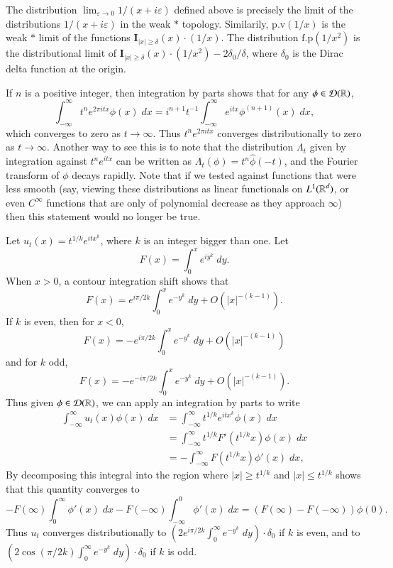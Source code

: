 \begin{example}
    The distribution $\lim_{\varepsilon \to 0} 1/(x + i\varepsilon)$ defined above is precisely the limit of the distributions $1/(x + i \varepsilon)$ in the weak $*$ topology. Similarily, $\text{p.v}(1/x)$ is the weak $*$ limit of the functions $\mathbf{I}_{|x| \geq \delta}(x) \cdot (1/x)$. The distribution $\text{f.p}(1/x^2)$ is the distributional limit of $\mathbf{I}_{|x| \geq \delta}(x) \cdot (1/x^2) - 2 \delta_0 / \delta$, where $\delta_0$ is the Dirac delta function at the origin.
\end{example}

\begin{example}
    If $n$ is a positive integer, then integration by parts shows that for any $\phi \in \operatorname{\mathcal{D}}(\operatorname{\mathbb{R}})$,
    \[ \int_{-\infty}^\infty t^n e^{2 \pi itx} \phi(x)\; dx = i^{n+1} t^{-1} \int_{-\infty}^\infty e^{itx} \phi^{(n+1)}(x)\; dx, \]
    which converges to zero as $t \to \infty$. Thus $t^n e^{2 \pi itx}$ converges distributionally to zero as $t \to \infty$. Another way to see this is to note that the distribution $\Lambda_t$ given by integration against $t^n e^{itx}$ can be written as $\Lambda_t(\phi) = t^n \widehat{\phi}(-t)$, and the Fourier transform of $\phi$ decays rapidly. Note that if we tested against functions that were less smooth (say, viewing these distributions as linear functionals on $L^1(\operatorname{\mathbb{R}}^d)$, or even $C^\infty$ functions that are only of polynomial decrease as they approach $\infty$) then this statement would no longer be true.
\end{example}

\begin{example}
    Let $u_t(x) = t^{1/k} e^{itx^k}$, where $k$ is an integer bigger than one. Let
    \[ F(x) = \int_0^x e^{iy^k}\; dy. \]
    When $x > 0$, a contour integration shift shows that
    \[ F(x) = e^{i \pi / 2k} \int_0^x e^{-y^k}\; dy + O(|x|^{-(k-1)}). \]
    If $k$ is even, then for $x < 0$,
    \[ F(x) = - e^{i \pi / 2k} \int_0^x e^{-y^k}\; dy + O(|x|^{-(k-1)}) \]
    and for $k$ odd,
    \[ F(x) = - e^{-i \pi / 2k} \int_0^x e^{-y^k}\; dy + O(|x|^{-(k-1)}). \]
    Thus given $\phi \in \operatorname{\mathcal{D}}(\operatorname{\mathbb{R}})$, we can apply an integration by parts to write
    \begin{align*}
        \int_{-\infty}^\infty u_t(x) \phi(x)\; dx &= \int_{-\infty}^\infty t^{1/k} e^{itx^k} \phi(x)\; dx \\
        &= \int_{-\infty}^\infty t^{1/k} F'(t^{1/k} x) \phi(x)\; dx\\
        &= - \int_{-\infty}^\infty F(t^{1/k} x) \phi'(x)\; dx,
     \end{align*}
     By decomposing this integral into the region where $|x| \geq t^{1/k}$ and $|x| \leq t^{1/k}$ shows that this quantity converges to
     \[ - F(\infty) \int_0^\infty \phi'(x)\; dx - F(-\infty) \int_{-\infty}^0 \phi'(x)\; dx = (F(\infty) - F(-\infty)) \phi(0). \]
     Thus $u_t$ converges distributionally to $\left( 2 e^{i \pi / 2k} \int_0^\infty e^{-y^k}\; dy \right) \cdot \delta_0$ if $k$ is even, and to $\left( 2 \cos(\pi / 2k) \int_0^\infty e^{-y^k}\; dy \right) \cdot \delta_0$ if $k$ is odd.
\end{example}

